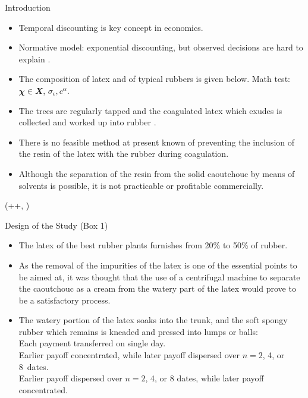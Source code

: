 \documentclass{beamer}
\newlength{\blockThree}
\newcommand{\balA}[1][1]{BAL$^\mathup{I}_{#1:#1}$\xspace}
\newcommand{\unbalA}[1][n]{UNBAL$^\mathup{I}_{1:#1}$\xspace}
\newcommand{\balB}[1][1]{BAL$^\mathup{II}_{#1:#1}$\xspace}
\newcommand{\unbalB}[1][n]{UNBAL$^\mathup{II}_{#1:1}$\xspace}
\begin{document}
\begin{frame}[t]
\begin{textblock*}{\colwidth}
\begin{block}{Introduction}
\vspace{-0.333333\baselineskip}
\begin{itemize}
	\item Temporal discounting is key concept in economics.
	\item Normative model: exponential discounting, but observed decisions are hard to explain \citep[e.g.,][]{Dohmen2012}.
	\item The composition of latex and of typical rubbers is given below. Math test: $\mathbfit{\chi} \in \mathbfit{X}$, $\sigma_\epsilon, c^\alpha$.
	\item The trees are regularly tapped and the coagulated latex which exudes is collected and worked up into rubber \citep{Koszegi2013}.
	\item There is no feasible method at present known of preventing the inclusion of the resin of the latex with the rubber during coagulation.
	\item Although the separation of the resin from the solid caoutchouc by means of solvents is possible, it is not practicable or profitable commercially.
\end{itemize}
\end{block}

\end{textblock*}




\begin{textblock*}{\colwidth}(\leftmargin+\colwidth+\colsep, \blockThree)

\begin{block}{Design of the Study {\mdseries(Box 1)}}
\vspace{-0.333333\baselineskip}
\begin{itemize}
	\item The latex of the best rubber plants furnishes from 20\% to 50\% of rubber.
	\item As the removal of the impurities of the latex is one of the essential points to be aimed at, it was thought that the use of a centrifugal machine to separate the caoutchouc as a cream from the watery part of the latex would prove to be a satisfactory process.
	\item The watery portion of the latex soaks into the trunk, and the soft spongy rubber which remains is kneaded and pressed into lumps or balls: \\[0.333333\baselineskip]
	\highlight{\balA, \balB:} Each payment transferred on single day. \\[0.333333\baselineskip]
	\highlight{\unbalA:} Earlier payoff concentrated, while later payoff dispersed over ${n = 2}$, 4, or 8~dates. \\[0.333333\baselineskip]
	\highlight{\unbalB:} Earlier payoff dispersed over ${n = 2}$, 4, or 8 dates, while later payoff concentrated.
\end{itemize}
\end{block}


\end{textblock*}
\end{frame}
\end{document}
